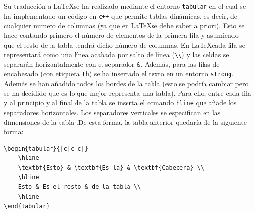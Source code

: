 \documentclass[12pt]{article}
\begin{document}
Su traducción a \LaTeX se ha realizado mediante el entorno \verb|tabular| en el cual se ha implementado un código en \verb|c++| que permite tablas dinámicas, es decir, de cualquier numero de columnas (ya que en \LaTeX se debe saber a priori). Esto se hace contando primero el número de elementos de la primera fila y asumiendo que el resto de la tabla tendrá dicho número de columnas. En \LaTeX cada fila se representará como una línea acabada por salto de línea (\verb|\\|) y las celdas se separarán horizontalmente con el separador \verb|&|. Además, para las filas de encabezado (con etiqueta \verb|th|) se ha insertado el texto en un entorno \verb|strong|. Además se han añadido todos los bordes de la tabla (esto se podría cambiar pero se ha decidido que es lo que mejor representa una tabla). Para ello, entre cada fila y al principio y al final de la tabla se inserta el comando \verb|hline| que añade los separadores horizontales. Los separadores verticales se especifican en las dimensiones de la tabla .De esta forma, la tabla anterior quedaría de la siguiente forma:
\begin{verbatim}
\begin{tabular}{|c|c|c|}
    \hline
    \textbf{Esto} & \textbf{Es la} & \textbf{Cabecera} \\
    \hline
    Esto & Es el resto & de la tabla \\
    \hline
\end{tabular} 
\end{verbatim}
\end{document}
